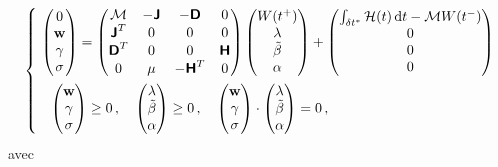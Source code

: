 \begin{align} \label{eq:bilan3}
\begin{dcases} \,\,
    \begin{pmatrix}
        0 \\ \bvec{w} \\ \gamma \\ \sigma 
    \end{pmatrix} =  
    \begin{pmatrix}
        \mathcal{M} &  -\bmat{J} & -\bmat{D} & 0 \\
        \bmat{J}^T & 0 & 0 & 0 \\
        \bmat{D}^T & 0 & 0 & \bmat{H} \\
        0 & \mu & -\bmat{H}^T & 0
    \end{pmatrix} 
    \begin{pmatrix}
        W(t^+) \\ \lambda \\ \tilde{\beta} \\ \alpha
    \end{pmatrix} + 
    \begin{pmatrix}
        \int_{\delta t^*} \mathcal{H}(t) \diff t - \mathcal{M} W(t^{-}) \\ 0 \\ 0 \\ 0
    \end{pmatrix} \\ \quad
    \begin{pmatrix}
        \bvec{w} \\ \gamma \\ \sigma
    \end{pmatrix} \geq 0 \,, \quad
    \begin{pmatrix}
        \lambda \\ \tilde{\beta} \\ \alpha
    \end{pmatrix} \geq 0 \,, \quad
    \begin{pmatrix}
        \bvec{w} \\ \gamma \\ \sigma
    \end{pmatrix} \cdot
    \begin{pmatrix}
        \lambda \\ \tilde{\beta} \\ \alpha
    \end{pmatrix}  
     = 0 \,,
\end{dcases}
\end{align}
avec
